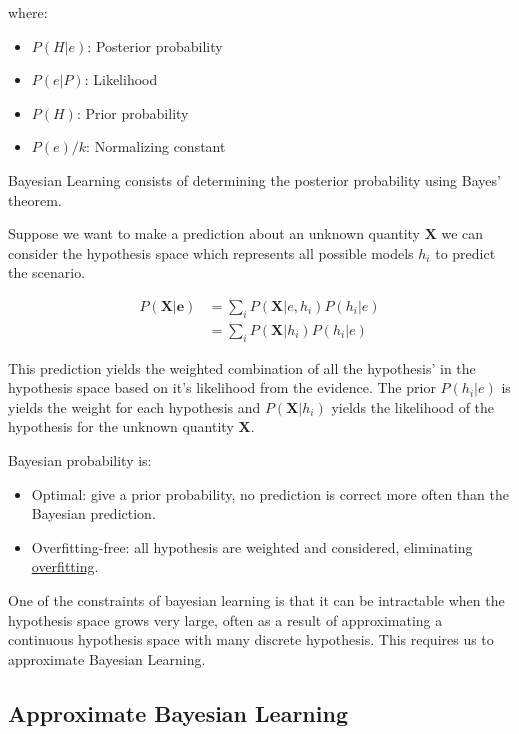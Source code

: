 \documentclass[12pt]{article}
\begin{document}
    where:
    \begin{itemize}
        \item $P(H|e)$: Posterior probability \label{fact:Posterior}
        \item $P(e|P)$: Likelihood \label{fact:Likelihood}
        \item $P(H)$: Prior probability \label{fact:Prior}
        \item $P(e)/k$: Normalizing constant
    \end{itemize}

    Bayesian Learning consists of determining the posterior probability using Bayes' theorem.
    
    Suppose we want to make a prediction about an unknown quantity $\boldsymbol{X}$ we can consider the hypothesis space
    which represents all possible models $h_i$ to predict the scenario.

    \begin{align}
        P(\boldsymbol{X}|\boldsymbol{e}) &= \sum_i P(\boldsymbol{X}|e, h_i)P(h_i|e) \\
        &= \sum_i P(\boldsymbol{X}|h_i)P(h_i|e)
    \end{align}

    This prediction yields the weighted combination of all the hypothesis' in the hypothesis space based on it's
    likelihood from the evidence. The prior $P(h_i | e)$ is yields the weight for each hypothesis and
    $P(\boldsymbol{X}|h_i)$ yields the likelihood of the hypothesis for the unknown quantity $\boldsymbol{X}$.

    Bayesian probability is:
    \begin{itemize}
        \item Optimal: give a prior probability, no prediction is correct more often than the Bayesian prediction.
        \item Overfitting-free: all hypothesis are weighted and considered, eliminating
        \hyperref[sec:Overfitting]{overfitting}.
    \end{itemize}

    One of the constraints of bayesian learning is that it can be intractable when the hypothesis space grows very
    large, often as a result of approximating a continuous hypothesis space with many discrete hypothesis. This requires
    us to approximate Bayesian Learning.

    \subsection{Approximate Bayesian Learning}
\end{document}
